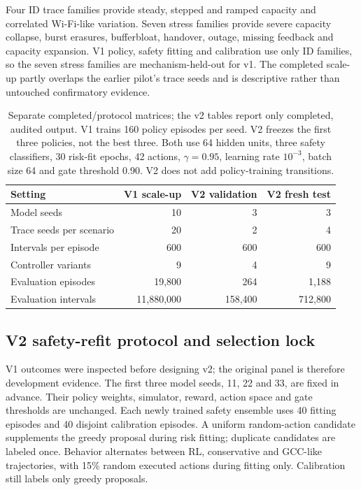 \documentclass[10pt]{article}
\begin{document}
Four ID trace families provide steady, stepped and ramped capacity and correlated Wi-Fi-like variation. Seven stress families provide severe capacity collapse, burst erasures, bufferbloat, handover, outage, missing feedback and capacity expansion. V1 policy, safety fitting and calibration use only ID families, so the seven stress families are mechanism-held-out for v1. The completed scale-up partly overlaps the earlier pilot's trace seeds and is descriptive rather than untouched confirmatory evidence.

\begin{table}[t]
\centering
\begin{tabular}{lrrr}
\toprule
Setting & V1 scale-up & V2 validation & V2 fresh test \\
\midrule
Model seeds & 10 & 3 & 3 \\
Trace seeds per scenario & 20 & 2 & 4 \\
Intervals per episode & 600 & 600 & 600 \\
Controller variants & 9 & 4 & 9 \\
Evaluation episodes & 19,800 & 264 & 1,188 \\
Evaluation intervals & 11,880,000 & 158,400 & 712,800 \\
\bottomrule
\end{tabular}
\caption{Separate completed/protocol matrices; the v2 tables report only completed, audited output. V1 trains 160 policy episodes per seed. V2 freezes the first three policies, not the best three. Both use 64 hidden units, three safety classifiers, 30 risk-fit epochs, 42 actions, $\gamma=0.95$, learning rate $10^{-3}$, batch size 64 and gate threshold 0.90. V2 does not add policy-training transitions.}\label{tab:protocol}
\end{table}

\subsection{V2 safety-refit protocol and selection lock}
V1 outcomes were inspected before designing v2; the original panel is therefore development evidence. The first three model seeds, 11, 22 and 33, are fixed in advance. Their policy weights, simulator, reward, action space and gate thresholds are unchanged. Each newly trained safety ensemble uses 40 fitting episodes and 40 disjoint calibration episodes. A uniform random-action candidate supplements the greedy proposal during risk fitting; duplicate candidates are labeled once. Behavior alternates between RL, conservative and GCC-like trajectories, with 15\% random executed actions during fitting only. Calibration still labels only greedy proposals.
\end{document}
